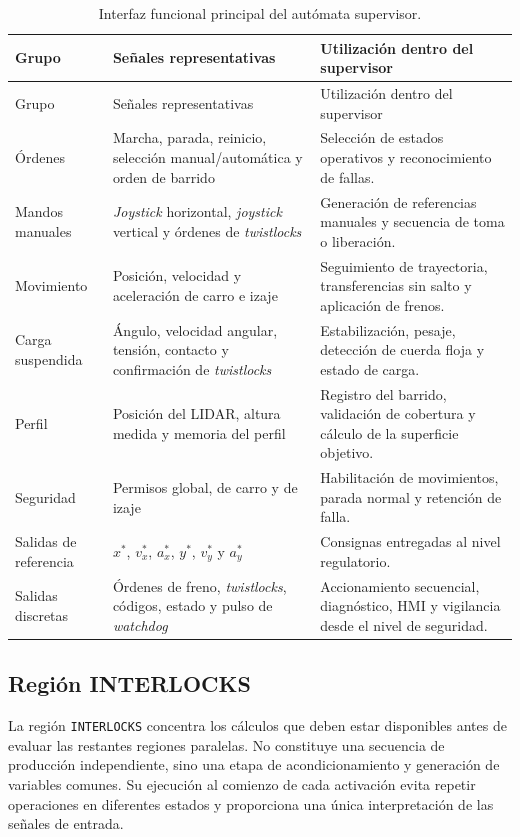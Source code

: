 \documentclass[a4paper,10pt,onecolumn,journal]{ieeeconf}
\numberwithin{equation}{section}
\begin{document}
\begin{longtable}{L{4.1cm} L{4.2cm} L{5.3cm}}
\caption{Interfaz funcional principal del autómata supervisor.}\label{tab:interfaz_supervisor}\\
\toprule
Grupo & Señales representativas & Utilización dentro del supervisor\\
\midrule
\endfirsthead
\toprule
Grupo & Señales representativas & Utilización dentro del supervisor\\
\midrule
\endhead
Órdenes & Marcha, parada, reinicio, selección manual/automática y orden de barrido & Selección de estados operativos y reconocimiento de fallas.\\
Mandos manuales & \textit{Joystick} horizontal, \textit{joystick} vertical y órdenes de \textit{twistlocks} & Generación de referencias manuales y secuencia de toma o liberación.\\
Movimiento & Posición, velocidad y aceleración de carro e izaje & Seguimiento de trayectoria, transferencias sin salto y aplicación de frenos.\\
Carga suspendida & Ángulo, velocidad angular, tensión, contacto y confirmación de \textit{twistlocks} & Estabilización, pesaje, detección de cuerda floja y estado de carga.\\
Perfil & Posición del LIDAR, altura medida y memoria del perfil & Registro del barrido, validación de cobertura y cálculo de la superficie objetivo.\\
Seguridad & Permisos global, de carro y de izaje & Habilitación de movimientos, parada normal y retención de falla.\\
Salidas de referencia & $x^*$, $v_x^*$, $a_x^*$, $y^*$, $v_y^*$ y $a_y^*$ & Consignas entregadas al nivel regulatorio.\\
Salidas discretas & Órdenes de freno, \textit{twistlocks}, códigos, estado y pulso de \textit{watchdog} & Accionamiento secuencial, diagnóstico, HMI y vigilancia desde el nivel de seguridad.\\
\bottomrule
\end{longtable}

\subsection{Región INTERLOCKS}
La región \texttt{INTERLOCKS} concentra los cálculos que deben estar disponibles antes de evaluar las restantes regiones paralelas. No constituye una secuencia de producción independiente, sino una etapa de acondicionamiento y generación de variables comunes. Su ejecución al comienzo de cada activación evita repetir operaciones en diferentes estados y proporciona una única interpretación de las señales de entrada.
\end{document}
